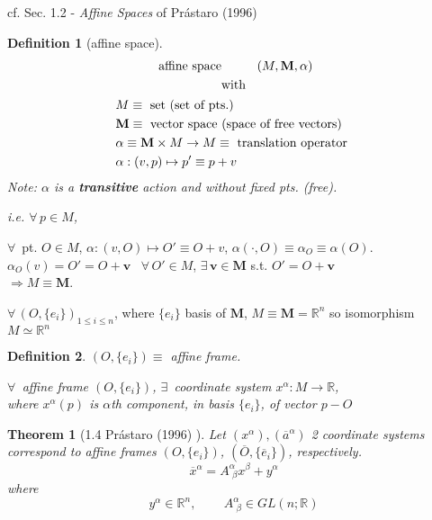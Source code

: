 \documentclass[10pt]{amsart}
\newtheorem{theorem}{Theorem}
\newtheorem{definition}{Definition}
\begin{document}
\begin{multicols*}{2}
cf. Sec. 1.2 - \emph{Affine Spaces} of Pr\'{a}staro (1996) \cite{Pras1996}

\begin{definition}[affine space]
  \begin{equation}
\begin{gathered}
    \text{ affine space \qquad \, } (M, \mathbf{M}, \alpha )  \\
    \text{ with } \\
    \begin{aligned}
      & M \equiv \text{ set (set of pts.) }  \\ 
      & \mathbf{M} \equiv \text{ vector space (space of free vectors) } \\
      & \alpha \equiv \mathbf{M} \times M \to M \equiv \text{ translation operator } \\
      & \alpha : (v,p ) \mapsto p' \equiv p + v
      \end{aligned}
\end{gathered}
  \end{equation}
  Note: $\alpha$ is a \textbf{transitive} action and without fixed pts. (free).

  i.e. $\forall \, p \in M$, 
  \end{definition}

$\forall \, $ pt. $O \in M$, $\alpha:(v,O) \mapsto O' \equiv O + v$, $\alpha (\cdot , O) \equiv \alpha_O \equiv \alpha(O)$.  $\alpha_O(v) = O' = O + \mathbf{v}$ \qquad \, $\forall \, O' \in M$, $\exists \, \mathbf{v} \in \mathbf{M}$ s.t. $O' = O + \mathbf{v}$ \\
$\Longrightarrow M \equiv \mathbf{M}$.

$\forall \, (O, \lbrace e_i \rbrace)_{1 \leq i \leq n }$, where $\lbrace e_i \rbrace$ basis of $\mathbf{M}$, $M \equiv \mathbf{M} = \mathbb{R}^n$ so isomorphism $M \simeq \mathbb{R}^n$ \\
\begin{definition}
  $(O, \lbrace e_i \rbrace) \equiv $ affine frame.

  $\forall \, $ affine frame $(O,\lbrace e_i \rbrace)$, $\exists \, $ coordinate system $x^{\alpha} : M \to \mathbb{R}$, \\
  where $x^{\alpha}(p)$ is $\alpha$th component, in basis $\lbrace e_i \rbrace$, of vector $p-O$
  \end{definition}

\begin{theorem}[1.4 Pr\'{a}staro (1996) \cite{Pras1996}]
  Let $(x^{\alpha}), (\overline{a}^{\alpha})$ 2 coordinate systems correspond to affine frames $(O, \lbrace e_i \rbrace)$, $( \overline{O}, \lbrace \overline{e}_i \rbrace )$, respectively.
\begin{equation}
  \overline{x}^{\alpha} = A^{\alpha}_{ \, \, \beta} x^{\beta} + y^{\alpha}
\end{equation}
where
\[
y^{\alpha} \in \mathbb{R}^n, \qquad \, A^{\alpha}_{ \, \, \beta} \in GL(n; \mathbb{R})
\]
\end{theorem}


\end{multicols*}
\end{document}
